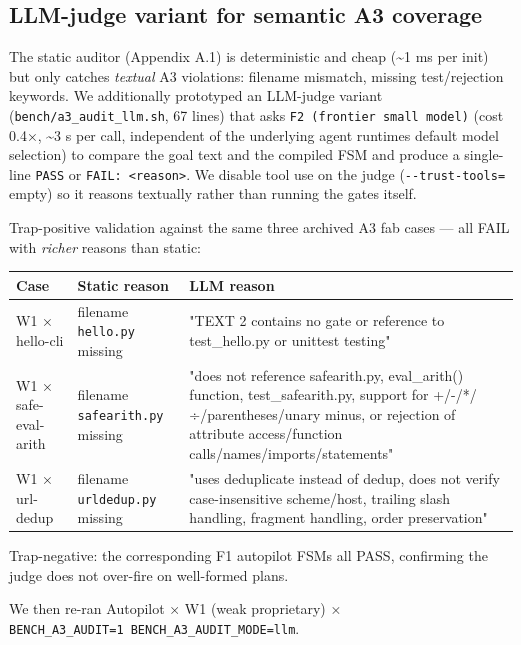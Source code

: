\subsection{LLM-judge variant for semantic A3 coverage}\label{app:llm-judge}
\label{llm-judge-auditor-semantic-a3-coverage-with-richer-reasoning}

The static auditor (Appendix A.1) is deterministic and cheap (\textasciitilde1 ms per init) but only catches
\emph{textual} A3 violations: filename mismatch, missing test/rejection keywords. We additionally
prototyped an LLM-judge variant (\texttt{bench/a3\_audit\_llm.sh}, 67 lines) that asks
\texttt{F2\ (frontier\ small\ model)} (cost 0.4×, \textasciitilde3 s per call, independent of the underlying agent runtime\textquotesingle s default model selection) to compare the
goal text and the compiled FSM and produce a single-line \texttt{PASS} or \texttt{FAIL:\ \textless{}reason\textgreater{}}. We
disable tool use on the judge (\texttt{-\/-trust-tools=} empty) so it reasons textually rather than
running the gates itself.

Trap-positive validation against the same three archived A3 fab cases --- all FAIL with
\emph{richer} reasons than static:

\begin{longtable}[]{@{}lll@{}}
\toprule\noalign{}
Case & Static reason & LLM reason \\
\midrule\noalign{}
\endhead
\bottomrule\noalign{}
\endlastfoot
W1 × hello-cli & filename \texttt{hello.py} missing & "TEXT 2 contains no gate or reference to test\_hello.py or unittest testing" \\
W1 × safe-eval-arith & filename \texttt{safearith.py} missing & "does not reference safearith.py, eval\_arith() function, test\_safearith.py, support for +/-/*/÷/parentheses/unary minus, or rejection of attribute access/function calls/names/imports/statements" \\
W1 × url-dedup & filename \texttt{urldedup.py} missing & "uses deduplicate instead of dedup, does not verify case-insensitive scheme/host, trailing slash handling, fragment handling, order preservation" \\
\end{longtable}

Trap-negative: the corresponding F1 autopilot FSMs all PASS, confirming the judge does
not over-fire on well-formed plans.

We then re-ran Autopilot × W1 (weak proprietary) × \texttt{BENCH\_A3\_AUDIT=1\ BENCH\_A3\_AUDIT\_MODE=llm}.

